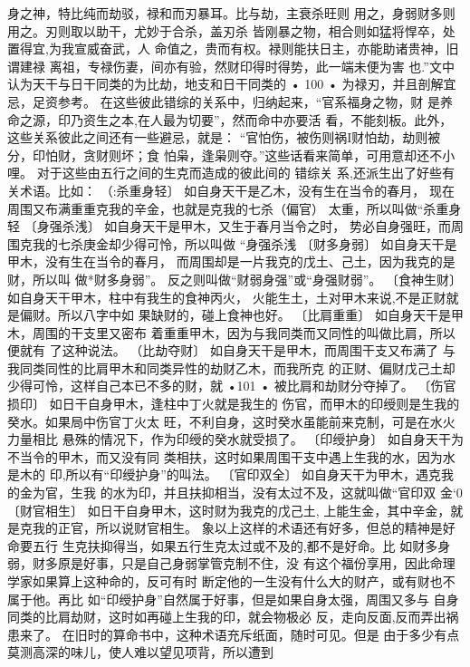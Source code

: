 身之神，特比纯而劫驳，禄和而刃暴耳。比与劫，主衰杀旺则
用之，身弱财多则用之。刃则取以助干，尤妙于合杀，盖刃杀
皆刚暴之物，相合则如猛将悍卒，处置得宜,为我宣威奋武，人
命值之，贵而有权。禄则能扶日主，亦能助诸贵神，旧谓建禄
离祖，专禄伤妻，间亦有验，然财印得时得势，此一端未便为害
也.”文中认为天干与日干同类的为比劫，地支和日干同类的
• 100 •
为禄刃，并且剖解宜忌，足资参考。
在这些彼此错综的关系中，归纳起来，“官系福身之物，财
是养命之源，印乃资生之本,在人最为切要”，然而命中亦要活
看，不能刻板。此外，这些关系彼此之间还有一些避忌，就是：
“官怕伤，被伤则祸I财怕劫，劫则被分，印怕财，贪财则坏；食
怕枭，逢枭则夺。”这些话看来简单，可用意却还不小哩。
对于这些由五行之间的生克而造成的彼此间的 错综关
系,还派生出了好些有关术语。比如：
（:杀重身轻〕 如自身天干是乙木，没有生在当令的春月，
现在周围又布满重重克我的辛金，也就是克我的七杀（偏官）
太重，所以叫做“杀重身轻
〔身强杀浅〕 如自身天干是甲木，又生于春月当令之时，
势必自身强旺，而周围克我的七杀庚金却少得可怜，所以叫做
“身强杀浅
〔财多身弱〕 如自身天干是甲木，没有生在当令的春月，
而周围却是一片我克的戊土、己土，因为我克的是财，所以叫
做*财多身弱”。 反之则叫做“财弱身强”或“身强财弱”。
〔食神生财〕 如自身天干甲木，柱中有我生的食神丙火，
火能生土，土对甲木来说,不是正财就是偏财。所以八字中如
果缺财的，碰上食神也好。
〔比肩重重〕 如自身天干是甲木，周围的干支里又密布
着重重甲木，因为与我同类而又同性的叫做比肩，所以便就有
了这种说法。
（比劫夺财〕 如自身天干是甲木，而周围干支又布满了
与我同类同性的比肩甲木和同类异性的劫财乙木，而我所克
的正财、偏财戊己土却少得可怜，这样自己本已不多的财，就
•101 •
被比肩和劫财分夺掉了。
〔伤官损印〕 如日干自身甲木，逢柱中丁火就是我生的
伤官，而甲木的印绶则是生我的癸水。如果局中伤官丁火太
旺，不利自身，这时癸水虽能前来克制，可是在水火力量相比
悬殊的情况下，作为印绶的癸水就受损了。
〔印绶护身〕 如自身天干为不当令的甲木，而又没有同
类相扶，这时如果周围干支中遇上生我的水，因为水是木的
印,所以有“印绶护身”的叫法。
〔官印双全〕 如自身天干为甲木，遇克我的金为官，生我
的水为印，并且扶抑相当，没有太过不及，这就叫做“官印双
金‘0
〔财官相生〕 如日干自身甲木，这时财为我克的戊己土,
上能生金，其中辛金，就是克我的正官，所以说财官相生。
象以上这样的术语还有好多，但总的精神是好命要五行
生克扶抑得当，如果五行生克太过或不及的,都不是好命。比
如财多身弱，财多原是好事，只是自己身弱掌管克制不住，没
有这个福份享用，因此命理学家如果算上这种命的，反可有时
断定他的一生没有什么大的财产，或有财也不属于他。再比
如“印绶护身”自然属于好事，但是如果自身太强，周围又多与
自身同类的比肩劫财，这时如再碰上生我的印，就会物极必
反，走向反面,反而弄出祸患来了。
在旧时的算命书中，这种术语充斥纸面，随时可见。但是
由于多少有点莫测高深的味儿，使人难以望见项背，所以遭到
